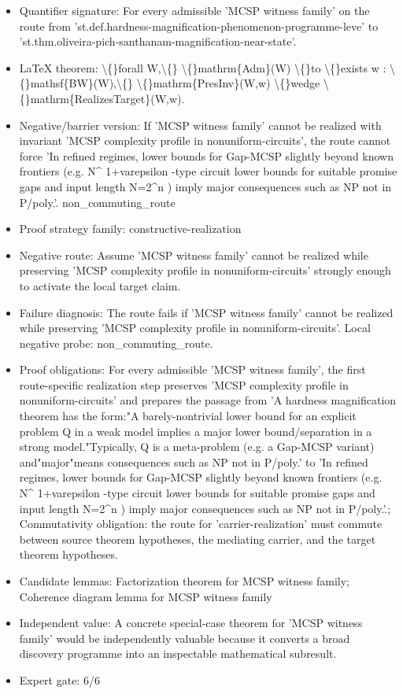 \documentclass[11pt]{article}
\begin{document}
\begin{itemize}
\item Quantifier signature: For every admissible 'MCSP witness family' on the route from 'st.def.hardness-magnification-phenomenon-programme-leve' to 'st.thm.oliveira-pich-santhanam-magnification-near-state'.
\item LaTeX theorem: \textbackslash\{\}forall W,\textbackslash\{\} \textbackslash\{\}mathrm\{Adm\}(W) \textbackslash\{\}to \textbackslash\{\}exists w : \textbackslash\{\}mathsf\{BW\}(W),\textbackslash\{\} \textbackslash\{\}mathrm\{PresInv\}(W,w) \textbackslash\{\}wedge \textbackslash\{\}mathrm\{RealizesTarget\}(W,w).
\item Negative/barrier version: If 'MCSP witness family' cannot be realized with invariant 'MCSP complexity profile in nonuniform-circuits', the route cannot force 'In refined regimes, lower bounds for Gap-MCSP slightly beyond known frontiers (e.g. N\textasciicircum{} 1+varepsilon -type circuit lower bounds for suitable promise gaps and input length N=2\textasciicircum{}n ) imply major consequences such as NP not in P/poly.'. non\_commuting\_route
\item Proof strategy family: constructive-realization
\item Negative route: Assume 'MCSP witness family' cannot be realized while preserving 'MCSP complexity profile in nonuniform-circuits' strongly enough to activate the local target claim.
\item Failure diagnosis: The route fails if 'MCSP witness family' cannot be realized while preserving 'MCSP complexity profile in nonuniform-circuits'. Local negative probe: non\_commuting\_route.
\item Proof obligations: For every admissible 'MCSP witness family', the first route-specific realization step preserves 'MCSP complexity profile in nonuniform-circuits' and prepares the passage from 'A hardness magnification theorem has the form:"A barely-nontrivial lower bound for an explicit problem Q in a weak model implies a major lower bound/separation in a strong model."Typically, Q is a meta-problem (e.g. a Gap-MCSP variant) and"major"means consequences such as NP not in P/poly.' to 'In refined regimes, lower bounds for Gap-MCSP slightly beyond known frontiers (e.g. N\textasciicircum{} 1+varepsilon -type circuit lower bounds for suitable promise gaps and input length N=2\textasciicircum{}n ) imply major consequences such as NP not in P/poly.'.; Commutativity obligation: the route for 'carrier-realization' must commute between source theorem hypotheses, the mediating carrier, and the target theorem hypotheses.
\item Candidate lemmas: Factorization theorem for MCSP witness family; Coherence diagram lemma for MCSP witness family
\item Independent value: A concrete special-case theorem for 'MCSP witness family' would be independently valuable because it converts a broad discovery programme into an inspectable mathematical subresult.
\item Expert gate: 6/6
\end{itemize}
\end{document}
